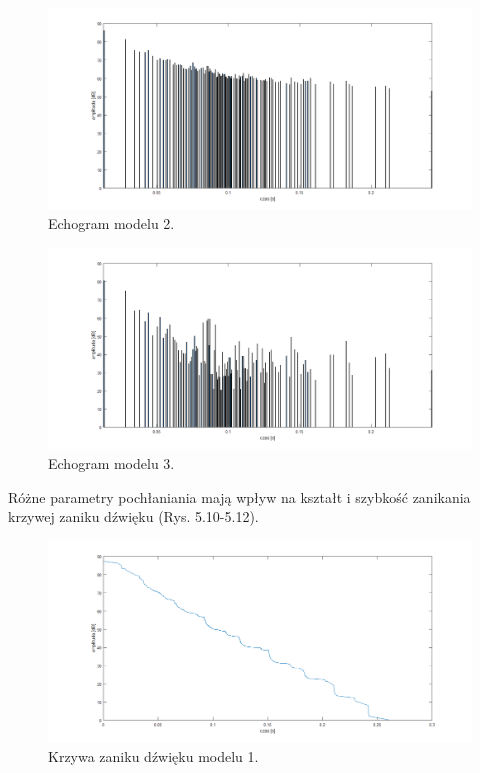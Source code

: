 \begin{figure}[h]
        \centering
                \centering
                \includegraphics[width=12cm]{echo2z}
	\caption{Echogram modelu 2.}
\end{figure}

\begin{figure}[h]
        \centering
                \centering
                \includegraphics[width=12cm]{echoz3}
	\caption{Echogram modelu 3.}
\end{figure}

Różne parametry pochłaniania mają wpływ na kształt i szybkość zanikania krzywej zaniku dźwięku (Rys. 5.10-5.12).

\begin{figure}[h]
        \centering
                \centering
                \includegraphics[width=12cm]{zanikz1}
	\caption{Krzywa zaniku dźwięku modelu 1.}
\end{figure}

